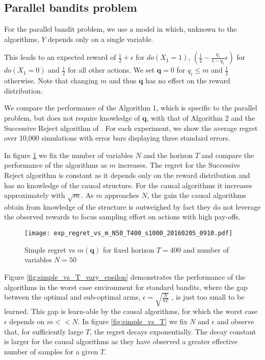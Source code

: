 \subsection{Parallel bandits problem}

For the parallel bandit problem, we use a model in which, unknown to the algorithms, $Y$ depends only on a single variable.

This leads to an expected reward of $\frac{1}{2}+\epsilon$ for $do(X_1=1)$, $\left(\frac{1}{2}-\frac{q_1}{1-q_1}\epsilon\right)$ for $do(X_1=0)$ and $\frac{1}{2}$ for all other actions. We set $\boldsymbol{q} = 0$ for $q_i \leq m$ and $\frac{1}{2}$ otherwise. Note that changing $m$ and thus $\boldsymbol{q}$ has no effect on the reward distribution. 

We compare the performance of the Algorithm 1, which is specific to the parallel problem, but does not require knowledge of $\boldsymbol{q}$, with that of Algorithm 2 and the Successive Reject algorithm of \cite{}. For each experiment, we show the average regret over 10,000 simulations with error bars displaying three standard errors.

In figure \ref{fig:simple_vs_m} we fix the number of variables $N$ and the horizon $T$ and compare the performance of the algorithms as $m$ increases. The regret for the Successive Reject algorithm is constant as it depends only on the reward distribution and has no knowledge of the causal structure. For the causal algorithms it increases approximately with $\sqrt{m}$. As $m$ approaches $N$, the gain the causal algorithms obtain from knowledge of the structure is outweighed by fact they do not leverage the observed rewards to focus sampling effort on actions with high pay-offs.

\begin{figure}[h]
\centering
\texttt{[image: exp\_regret\_vs\_m\_N50\_T400\_s1000\_20160205\_0910.pdf]}
\caption{Simple regret vs $m(\boldsymbol{q})$ for fixed horizon $T=400$ and number of variables $N = 50$}
\label{fig:simple_vs_m}
\end{figure}

Figure \ref{fig:simple_vs_T_vary_epsilon} demonstrates the performance of the algorithms in the worst case environment for standard bandits, where the gap between the optimal and sub-optimal arms, $\epsilon = \sqrt{\frac{N}{8T}}$ , is just too small to be learned. This gap is learn-able by the causal algorithms, for which the worst case $\epsilon$ depends on $m << N$. In figure \ref{fig:simple_vs_T} we fix $N$ and $\epsilon$ and observe that, for sufficiently large $T$, the regret decays exponentially. The decay constant is larger for the causal algorithms as they have observed a greater effective number of samples for a given $T$. 

